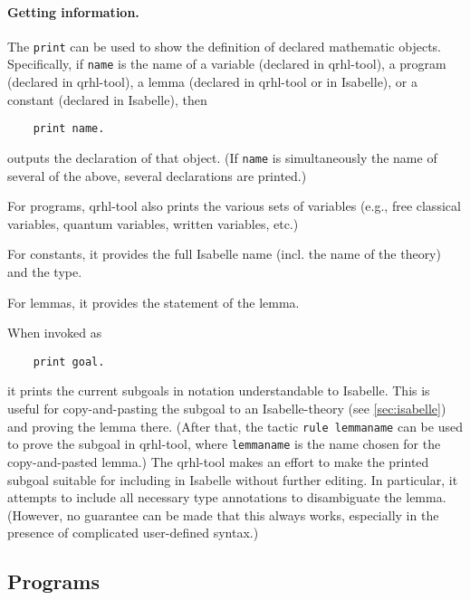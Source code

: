 \documentclass{article}
\makeatletter
\newcommand\toolidx[1]{\index{#1@\textttOLD{#1} (tool command)}}
\makeatother
\begin{document}
\paragraph{Getting information.}
The \toolidx{print}\texttt{print} can be used to show the definition of declared mathematic objects.
Specifically, if \texttt{name} is the name of a variable (declared in qrhl-tool), a program (declared in qrhl-tool), a lemma (declared in qrhl-tool or in Isabelle), or a constant (declared in Isabelle), then
\begin{center}
  \begin{lstlisting}
    print name.
  \end{lstlisting}
\end{center}
outputs the declaration of that object.
(If \texttt{name} is simultaneously the name of several of the above, several declarations are printed.)

For programs, qrhl-tool also prints the various sets of variables
(e.g., free classical variables, quantum variables, written variables,
etc.)

For constants, it provides the full Isabelle name (incl. the name of the theory) and the type.

For lemmas, it provides the statement of the lemma.

\medskip

When invoked as
\begin{center}
  \begin{lstlisting}
    print goal.
  \end{lstlisting}
\end{center}
it prints the current subgoals in notation understandable to Isabelle.
This is useful for copy-and-pasting the subgoal to an Isabelle-theory (see \autoref{sec:isabelle}) and proving the lemma there.
(After that, the tactic \texttt{rule lemmaname} can be used to prove the subgoal in qrhl-tool, where \texttt{lemmaname} is the name chosen for the copy-and-pasted lemma.)
The qrhl-tool makes an effort to make the printed subgoal suitable for including in Isabelle without further editing.
In particular, it attempts to include all necessary type annotations to disambiguate the lemma.
(However, no guarantee can be made that this always works, especially in the presence of complicated user-defined syntax.)



\subsection{Programs}
\label{sec:tool.programs}
\end{document}
